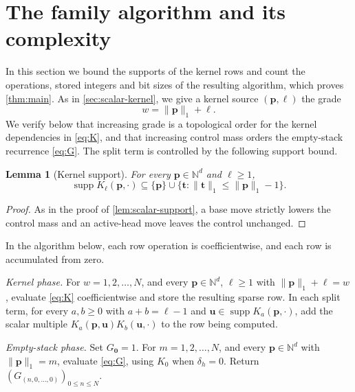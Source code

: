 \documentclass[11pt,reqno]{amsart}
\newtheorem{lemma}[lemma]{Lemma}
\theoremstyle{definition}
\theoremstyle{remark}
\newcommand{\supp}{\operatorname{supp}}
\newcommand{\N}{\mathbb N}
\begin{document}
\section{The family algorithm and its complexity}\label{sec:algorithm}

In this section we bound the supports of the kernel rows and count the
operations, stored integers and bit sizes of the resulting algorithm, which
proves \cref{thm:main}.  As in \cref{sec:scalar-kernel}, we give a kernel source
$(\mathbf p,\ell)$ the grade
\[
 w=\|\mathbf p\|_1+\ell.
\]
We verify below that increasing grade is a topological order for the kernel
dependencies in \eqref{eq:K}, and that increasing control mass orders the
empty-stack recurrence \eqref{eq:G}.  The split term is controlled by the
following support bound.

\begin{lemma}[Kernel support]\label{lem:support}
For every $\mathbf p\in\N^d$ and $\ell\geq1$,
\begin{equation}\label{eq:support}
 \supp K_\ell(\mathbf p,\mathord\cdot)
 \subseteq
 \{\mathbf p\}\cup
 \{\mathbf t:\|\mathbf t\|_1\leq\|\mathbf p\|_1-1\}.
\end{equation}
\end{lemma}

\begin{proof}
As in the proof of \cref{lem:scalar-support}, a base move strictly lowers
the control mass and an active-head move leaves the control unchanged.
\end{proof}

In the algorithm below, each row operation is coefficientwise, and each row
is accumulated from zero.

\emph{Kernel phase.}
For $w=1,2,\ldots,N$, and every $\mathbf p\in\N^d$, $\ell\geq1$ with
$\|\mathbf p\|_1+\ell=w$, evaluate \eqref{eq:K} coefficientwise and store
the resulting sparse row.  In each split term, for every $a,b\geq0$ with
$a+b=\ell-1$ and
$\mathbf u\in\supp K_a(\mathbf p,\mathord\cdot)$, add the scalar multiple
$K_a(\mathbf p,\mathbf u)K_b(\mathbf u,\mathord\cdot)$ to the row being
computed.

\emph{Empty-stack phase.}
Set $G_{\mathbf0}=1$.  For $m=1,2,\ldots,N$, and every
$\mathbf p\in\N^d$ with $\|\mathbf p\|_1=m$, evaluate \eqref{eq:G}, using
$K_0$ when $\delta_h=0$.  Return
$(G_{(n,0,\ldots,0)})_{0\leq n\leq N}$.
\end{document}
